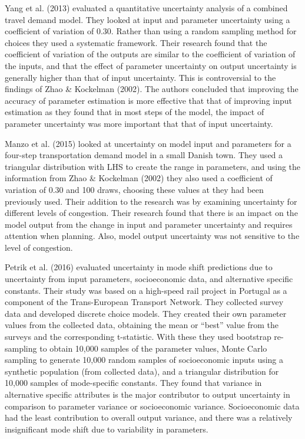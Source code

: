 \documentclass[fancy, masters,twoside]{byuthesis}
\begin{document}
Yang et al. (2013) evaluated a quantitative uncertainty analysis of a combined travel demand model. They looked at input and parameter uncertainty using a coefficient of variation of 0.30. Rather than using a random sampling method for choices they used a systematic framework. Their research found that the coefficient of variation of the outputs are similar to the coefficient of variation of the inputs, and that the effect of parameter uncertainty on output uncertainty is generally higher than that of input uncertainty. This is controversial to the findings of Zhao \& Kockelman (2002). The authors concluded that improving the accuracy of parameter estimation is more effective that that of improving input estimation as they found that in most steps of the model, the impact of parameter uncertainty was more important that that of input uncertainty.

Manzo et al. (2015) looked at uncertainty on model input and parameters for a four-step transportation demand model in a small Danish town. They used a triangular distribution with LHS to create the range in parameters, and using the information from Zhao \& Kockelman (2002) they also used a coefficient of variation of 0.30 and 100 draws, choosing these values at they had been previously used. Their addition to the research was by examining uncertainty for different levels of congestion. Their research found that there is an impact on the model output from the change in input and parameter uncertainty and requires attention when planning. Also, model output uncertainty was not sensitive to the level of congestion.

Petrik et al. (2016) evaluated uncertainty in mode shift predictions due to uncertainty from input parameters, socioeconomic data, and alternative specific constants. Their study was based on a high-speed rail project in Portugal as a component of the Trans-European Transport Network. They collected survey data and developed discrete choice models. They created their own parameter values from the collected data, obtaining the mean or ``best'' value from the surveys and the corresponding t-statistic. With these they used bootstrap re-sampling to obtain 10,000 samples of the parameter values, Monte Carlo sampling to generate 10,000 random samples of socioeconomic inputs using a synthetic population (from collected data), and a triangular distribution for 10,000 samples of mode-specific constants. They found that variance in alternative specific attributes is the major contributor to output uncertainty in comparison to parameter variance or socioeconomic variance. Socioeconomic data had the least contribution to overall output variance, and there was a relatively insignificant mode shift due to variability in parameters.
\end{document}
